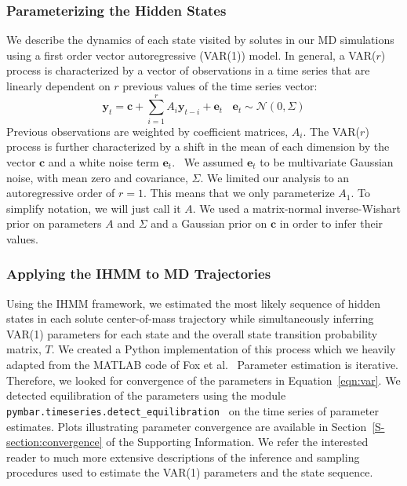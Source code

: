 \documentclass[journal=jpcbfk,manuscript=article]{achemso}
\begin{document}
  \subsubsection*{Parameterizing the Hidden States}\label{method:var_params}
  
  We describe the dynamics of each state visited by solutes in our MD simulations using
  a first order vector autoregressive (VAR(1)) model. In general, a VAR($r$) process is characterized by a
  vector of observations in a time series that are linearly dependent on $r$ previous
  values of the time series vector:
  \begin{equation}
  	\mathbf{y}_t = \mathbf{c} + \sum_{i=1}^r A_i\mathbf{y}_{t-i} + \mathbf{e}_t~~~~\mathbf{e}_t \sim \mathcal{N}(0, \Sigma)
  \label{eqn:var}
  \end{equation}
  Previous observations are weighted by coefficient matrices, $A_i$. The VAR($r$) 
  process is further characterized by a shift in the mean of each dimension by the
  vector $\mathbf{c}$ and a white noise term $\mathbf{e}_t$.~\cite{hamilton_time_1994}
  We assumed $\mathbf{e}_t$ to be multivariate Gaussian noise, with mean zero and
  covariance, $\Sigma$. We limited our analysis to an autoregressive order of $r=1$.
  This means that we only parameterize $A_1$. To simplify notation, we will just
  call it $A$. We used a matrix-normal inverse-Wishart prior on parameters $A$ and 
  $\Sigma$ and a Gaussian prior on $\mathbf{c}$ in order to infer their 
  values.~\cite{fox_nonparametric_2009}
   
  \subsubsection*{Applying the IHMM to MD Trajectories} 
   
  Using the IHMM framework, we estimated the most likely sequence of hidden states in
  each solute center-of-mass trajectory while simultaneously inferring VAR(1)
  parameters for each state and the overall state transition probability matrix, $T$.
  We created a Python implementation of this process which we heavily adapted from
  the MATLAB code of Fox et al.~\cite{fox_bayesian_2010} Parameter estimation is iterative. 
  Therefore, we looked for convergence of the parameters in Equation~\ref{eqn:var}.
  We detected equilibration of the parameters using the module \texttt{pymbar.timeseries.detect\_equilibration}~\cite{chodera_simple_2016} 
  on the time series of parameter estimates. Plots illustrating parameter convergence are 
  available in Section~\ref{S-section:convergence} of the Supporting Information. We 
  refer the interested reader to much more extensive descriptions of the inference and 
  sampling procedures used to estimate the VAR(1) parameters and the state sequence. ~\cite{beal_infinite_2002,teh_hierarchical_2006,van_gael_beam_2008,fox_nonparametric_2009,fox_bayesian_2010}
\end{document}
